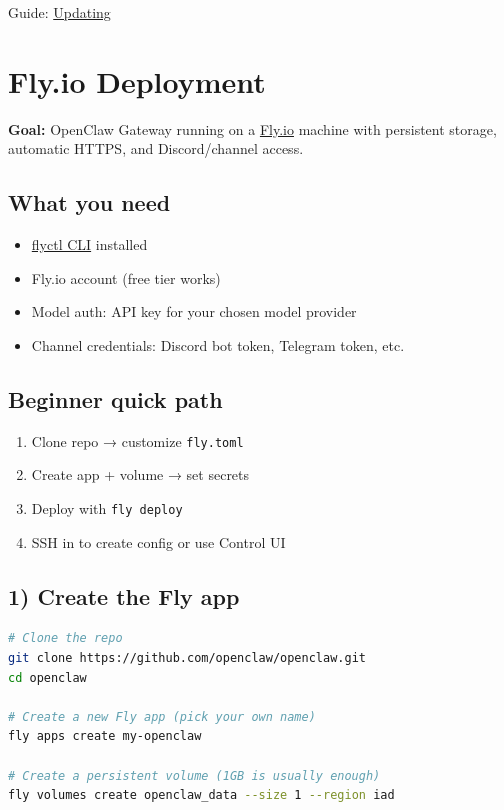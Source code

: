 Guide: \href{/install/updating}{Updating}


\clearpage

\section{Fly.io Deployment}


\textbf{Goal:} OpenClaw Gateway running on a \href{https://fly.io}{Fly.io} machine with persistent storage, automatic HTTPS, and Discord/channel access.

\subsection{What you need}


\begin{itemize}
  \item \href{https://fly.io/docs/hands-on/install-flyctl/}{flyctl CLI} installed
  \item Fly.io account (free tier works)
  \item Model auth: API key for your chosen model provider
  \item Channel credentials: Discord bot token, Telegram token, etc.
\end{itemize}


\subsection{Beginner quick path}


\begin{enumerate}
  \item Clone repo → customize \texttt{fly.toml}
  \item Create app + volume → set secrets
  \item Deploy with \texttt{fly deploy}
  \item SSH in to create config or use Control UI
\end{enumerate}


\subsection{1) Create the Fly app}


\begin{lstlisting}[language=bash]
# Clone the repo
git clone https://github.com/openclaw/openclaw.git
cd openclaw

# Create a new Fly app (pick your own name)
fly apps create my-openclaw

# Create a persistent volume (1GB is usually enough)
fly volumes create openclaw_data --size 1 --region iad
\end{lstlisting}


